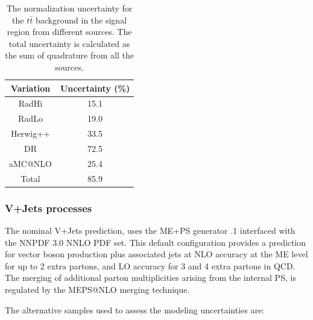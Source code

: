 \begin{table}[htbp!]
\begin{center}
\begin{tabular}{c|c}
Variation   &  Uncertainty (\%) \\
\hline
RadHi       &               15.1 \\
RadLo       &               19.0 \\
Herwig++    &               33.5 \\
DR          &               72.5 \\
aMC@NLO     &               25.4 \\
\hline
Total      &                85.9 \\
\end{tabular}
\end{center}
\caption{The normalization uncertainty for the $t\bar{t}$ background in the signal region
from different sources. The total uncertainty is calculated as the sum of quadrature from all
the sources.}
\label{tab:boosted_unc_singletopwt}
\end{table}
 
\FloatBarrier
 
 
\subsubsection{V+Jets processes}
\label{sec:boosted_syst_modeling_vjets}
 
The nominal V+Jets prediction, uses the ME+PS generator .1 interfaced with the NNPDF 3.0 NNLO PDF set.
This default configuration provides a prediction for vector boson production plus associated jets at NLO accuracy
at the ME level for up to 2 extra partons, and LO accuracy for 3 and 4 extra partons in QCD.
The merging of additional parton multiplicities arising from the internal \SHERPA PS, is regulated by the
MEPS@NLO merging technique.
 
The alternative samples used to assess the modeling uncertainties are:
 
